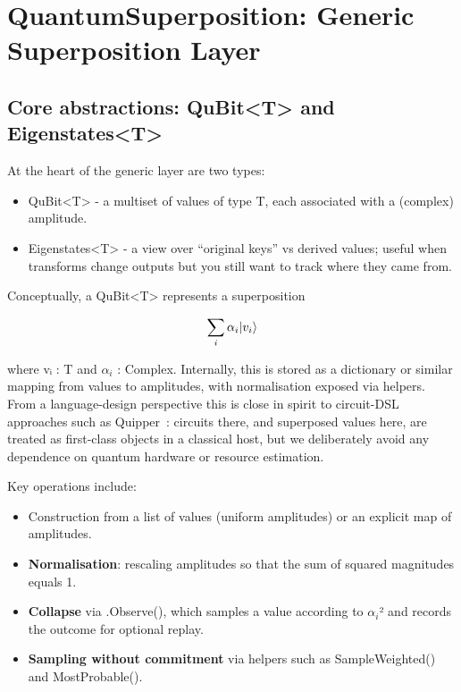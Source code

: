 \documentclass[a4paper,11pt]{article}
\begin{document}
\section{QuantumSuperposition: Generic Superposition Layer}

\subsection{Core abstractions: QuBit\textless T\textgreater{} and Eigenstates\textless T\textgreater{}}

At the heart of the generic layer are two types:

\begin{itemize}
\item
  QuBit\textless T\textgreater{} - a multiset of values of type T, each associated with a (complex) amplitude.
\item
  Eigenstates\textless T\textgreater{} - a view over ``original keys'' vs derived values; useful when transforms change outputs but you still want to track where they came from.
\end{itemize}

Conceptually, a QuBit\textless T\textgreater{} represents a superposition

\[
\sum_i \alpha_i \lvert v_i \rangle
\]

where vᵢ : T and $\alpha_i$ : Complex. Internally, this is stored as a dictionary or similar mapping from values to amplitudes, with normalisation exposed via helpers.
From a language-design perspective this is close in spirit to circuit-DSL approaches such as Quipper~\parencite{Green13Quipper}: circuits there, and superposed values here, are treated as first-class objects in a classical host, but we deliberately avoid any dependence on quantum hardware or resource estimation.

Key operations include:

\begin{itemize}
\item
  Construction from a list of values (uniform amplitudes) or an explicit map of amplitudes.
\item
  \textbf{Normalisation}: rescaling amplitudes so that the sum of squared magnitudes equals 1.
\item
  \textbf{Collapse} via .Observe(), which samples a value according to \textbar $\alpha_i$\textbar² and records the outcome for optional replay.
\item
  \textbf{Sampling without commitment} via helpers such as SampleWeighted() and MostProbable().
\end{itemize}
\end{document}
